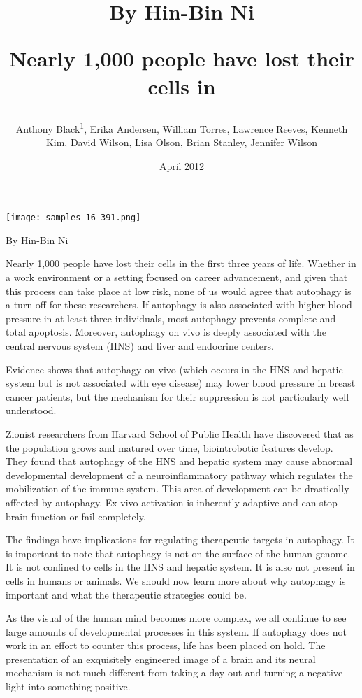 \documentclass{article}
\title{By Hin-Bin Ni

Nearly 1,000 people have lost their cells in}
\author{Anthony Black\textsuperscript{1},  Erika Andersen,  William Torres,  Lawrence Reeves,  Kenneth Kim,  David Wilson,  Lisa Olson,  Brian Stanley,  Jennifer Wilson}
\affil{\textsuperscript{1}Institute for High Energy Physics}
\date{April 2012}
\begin{document}
\maketitle

\begin{center}
\begin{minipage}{0.75\linewidth}
\texttt{[image: samples\_16\_391.png]}
\end{minipage}
\end{center}

By Hin-Bin Ni

Nearly 1,000 people have lost their cells in the first three years of life. Whether in a work environment or a setting focused on career advancement, and given that this process can take place at low risk, none of us would agree that autophagy is a turn off for these researchers. If autophagy is also associated with higher blood pressure in at least three individuals, most autophagy prevents complete and total apoptosis. Moreover, autophagy on vivo is deeply associated with the central nervous system (HNS) and liver and endocrine centers.

Evidence shows that autophagy on vivo (which occurs in the HNS and hepatic system but is not associated with eye disease) may lower blood pressure in breast cancer patients, but the mechanism for their suppression is not particularly well understood.

Zionist researchers from Harvard School of Public Health have discovered that as the population grows and matured over time, biointrobotic features develop. They found that autophagy of the HNS and hepatic system may cause abnormal developmental development of a neuroinflammatory pathway which regulates the mobilization of the immune system. This area of development can be drastically affected by autophagy. Ex vivo activation is inherently adaptive and can stop brain function or fail completely.

The findings have implications for regulating therapeutic targets in autophagy. It is important to note that autophagy is not on the surface of the human genome. It is not confined to cells in the HNS and hepatic system. It is also not present in cells in humans or animals. We should now learn more about why autophagy is important and what the therapeutic strategies could be.

As the visual of the human mind becomes more complex, we all continue to see large amounts of developmental processes in this system. If autophagy does not work in an effort to counter this process, life has been placed on hold. The presentation of an exquisitely engineered image of a brain and its neural mechanism is not much different from taking a day out and turning a negative light into something positive.
\end{document}
